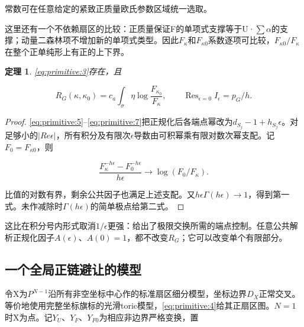 \documentclass[11pt,a4paper,oneside]{ctexart}
\theoremstyle{cnplain}
\newtheorem{theorem}{定理}[section]
\theoremstyle{definition}
\theoremstyle{remark}
\numberwithin{equation}{section}
\begin{document}
常数可在任意给定的紧致正质量欧氏参数区域统一选取。

这里还有一个不依赖扇区的比较：正质量保证F的单项式支撑等于U·\(\sum \alpha \)的支撑；动量二森林项不增加新的单项式类型。因此\(F_\kappa \)和\(F_{\kappa 0}\)系数逐项可比较，\(F_{\kappa 0}/F_\kappa \)在整个正单纯形上有正的上下界。

\begin{theorem}

\label{thm:primitive:2.1} \eqref{eq:primitive:3}存在，且

\begin{equation}
R_G(\kappa,\kappa_0)=c_a\int_\sigma\eta
                            \log\frac{F_{\kappa_0}}{F_\kappa},
 \qquad \operatorname{Res}_{\epsilon=0}I_\epsilon=p_G/h.          \label{eq:primitive:8}
\end{equation}

\end{theorem}

\begin{proof}

\eqref{eq:primitive:5}--\eqref{eq:primitive:7}把正规化后各端点幂改为\(d_{S_j}- 1+h_{S_j}\epsilon \)。对足够小的\(|Re \epsilon |\)，所有积分及有限次\(\epsilon \)导数由可积幂乘有限对数次幂支配。记\(F_0=F_{\kappa 0}\)，则

\begin{equation}
\frac{F_\kappa^{-h\epsilon}-F_0^{-h\epsilon}}{h\epsilon}
                    \longrightarrow\log(F_0/F_\kappa).
\end{equation}

比值的对数有界，剩余公共因子也满足上述支配。又\(h\epsilon \Gamma (h\epsilon )\to 1\)，得到第一式。未作减除时\(\Gamma (h\epsilon )\)的简单极点给第二式。

\end{proof}

这比在积分号内形式取消\(1/\epsilon \)更强：给出了极限交换所需的端点控制。任意公共解析正规化因子\(A(\epsilon )\)、\(A(0)=1\)，都不改变\(R_G\)；它可以改变单个有限部分。


\subsection{一个全局正链避让的模型}\label{sec:primitive:3}

令X为\(P^{N- 1}\)沿所有非空坐标中心作的标准扇区细分模型，坐标边界\(D_X\)正常交叉。等价地使用完整坐标旗标的光滑toric模型，\eqref{eq:primitive:4}给其正扇区图。\(N=1\)时X为点。记\(Y_U\)、\(Y_F\)、\(Y_{F0}\)为相应非边界严格变换，置
\end{document}
